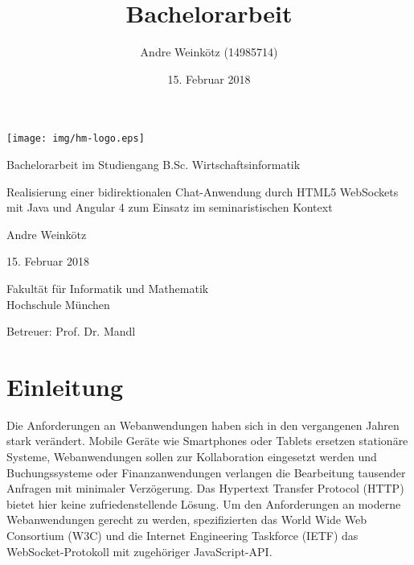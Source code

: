 \documentclass[11pt,a4paper,titlepage]{scrartcl}
\title{Bachelorarbeit}
\author{Andre Weinkötz (14985714)}
\date{15. Februar 2018}
\numberwithin{equation}{section}
\begin{document}
  \pagestyle{empty}

  \begin{titlepage}

\begin{center}
	\texttt{[image: img/hm-logo.eps]}
\end{center}
 \bigskip

 \begin{center} \large 
    
    Bachelorarbeit im Studiengang B.Sc. Wirtschaftsinformatik
    \vspace*{2.5cm}
\end{center}
\begin{center}
	    {\huge Realisierung einer bidirektionalen Chat-Anwendung durch HTML5 WebSockets mit Java und Angular 4 zum Einsatz im seminaristischen Kontext}
\end{center}

    
    \vspace*{2.0cm}
 \begin{center}
    Andre Weinkötz \bigskip
    
    

    15. Februar 2018
    \vspace*{2.5cm}
    
    

    Fakultät für Informatik und Mathematik \\
	Hochschule München\bigskip
	
	Betreuer: Prof. Dr. Mandl 
	
	
  \end{center}
\end{titlepage}


 \tableofcontents

\newpage
  \pagestyle{headings}

\section{Einleitung}\label{sec:Einleitung}
Die Anforderungen an Webanwendungen haben sich in den vergangenen Jahren stark verändert. Mobile Geräte wie Smartphones oder Tablets ersetzen stationäre Systeme, Webanwendungen sollen zur Kollaboration eingesetzt werden und Buchungssysteme oder Finanzanwendungen verlangen die Bearbeitung tausender Anfragen mit minimaler Verzögerung. Das Hypertext Transfer Protocol (HTTP) bietet hier keine zufriedenstellende Lösung. Um den Anforderungen an moderne Webanwendungen gerecht zu werden, spezifizierten das World Wide Web Consortium (W3C) und die Internet Engineering Taskforce (IETF) das WebSocket-Protokoll mit zugehöriger JavaScript-API. \\
\end{document}
